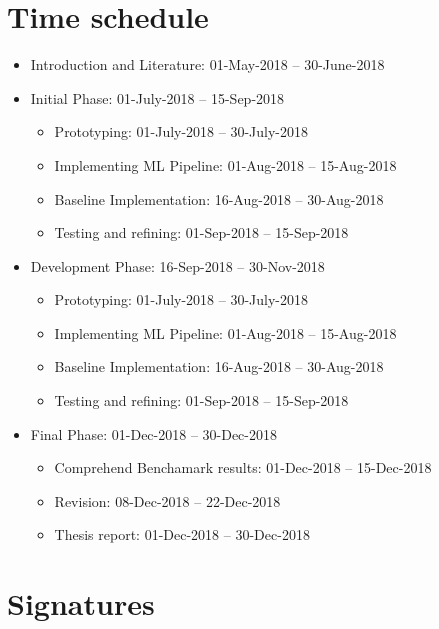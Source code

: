 \documentclass[a4paper, 11pt]{article}
\begin{document}

\section{Time schedule}

\begin{itemize}
	\item Introduction and Literature: 01-May-2018 – 30-June-2018
	\item Initial Phase: 01-July-2018 – 15-Sep-2018
	\begin{itemize}
		\item Prototyping: 01-July-2018 – 30-July-2018
		\item Implementing ML Pipeline: 01-Aug-2018 – 15-Aug-2018
        \item Baseline Implementation: 16-Aug-2018 – 30-Aug-2018
        \item Testing and refining: 01-Sep-2018 – 15-Sep-2018
	\end{itemize}
	\item Development Phase: 16-Sep-2018 – 30-Nov-2018
	\begin{itemize}
		\item Prototyping: 01-July-2018 – 30-July-2018
		\item Implementing ML Pipeline: 01-Aug-2018 – 15-Aug-2018
        \item Baseline Implementation: 16-Aug-2018 – 30-Aug-2018
        \item Testing and refining: 01-Sep-2018 – 15-Sep-2018
	\end{itemize}
	\item Final Phase: 01-Dec-2018 – 30-Dec-2018
	\begin{itemize}
	 	\item Comprehend Benchamark results: 01-Dec-2018 – 15-Dec-2018
		\item Revision: 08-Dec-2018 – 22-Dec-2018
		\item Thesis report: 01-Dec-2018 – 30-Dec-2018
	\end{itemize}
\end{itemize}



\newpage

\newpage
\section{Signatures}
\end{document}
